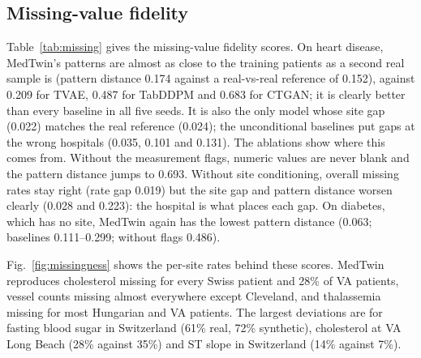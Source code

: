 \documentclass[runningheads]{llncs}
\begin{document}
\subsection{Missing-value fidelity}
\label{sec:missingness}

\begin{table}[t]
\caption{Missing-value fidelity (left, lower is better) and privacy (right),
mean $\pm$ SD over five seeds. The reference row compares held-out with
training patients. MIA rare/common: membership-inference AUC on patients with
rare/common missingness patterns; unique leak in percentage points. Ablation
rows come from separate runs and are compared with their own full model
($^*$: clear paired difference). Bold marks the best fidelity among models.
On diabetes only $\approx$8 patients per draw have a rare pattern and
$\approx$2 patterns are unique, so its privacy columns are inconclusive.}
\label{tab:missing}
\centering\scriptsize\setlength{\tabcolsep}{2.2pt}
\resizebox{\textwidth}{!}{}
\end{table}

Table~\ref{tab:missing} gives the missing-value fidelity scores. On heart
disease, MedTwin's patterns are almost as close to the training patients as
a second real sample is (pattern distance 0.174 against a real-vs-real
reference of 0.152), against 0.209 for TVAE, 0.487 for TabDDPM and 0.683
for CTGAN; it is clearly better than every baseline in all five seeds. It is
also the only model whose site gap (0.022) matches the real reference
(0.024); the unconditional baselines put gaps at the wrong hospitals (0.035,
0.101 and 0.131). The ablations show where this comes from. Without the
measurement flags, numeric values are never blank and the pattern distance
jumps to 0.693. Without site conditioning, overall missing rates stay right
(rate gap 0.019) but the site gap and pattern distance worsen clearly (0.028
and 0.223): the hospital is what places each gap. On diabetes, which has no
site, MedTwin again has the lowest pattern distance (0.063; baselines
0.111--0.299; without flags 0.486).

Fig.~\ref{fig:missingness} shows the per-site rates behind these scores.
MedTwin reproduces cholesterol missing for every Swiss patient and 28\% of
VA patients, vessel counts missing almost everywhere except Cleveland, and
thalassemia missing for most Hungarian and VA patients. The largest
deviations are for fasting blood sugar in Switzerland (61\% real, 72\%
synthetic), cholesterol at VA Long Beach (28\% against 35\%) and ST slope in
Switzerland (14\% against 7\%).
\end{document}
